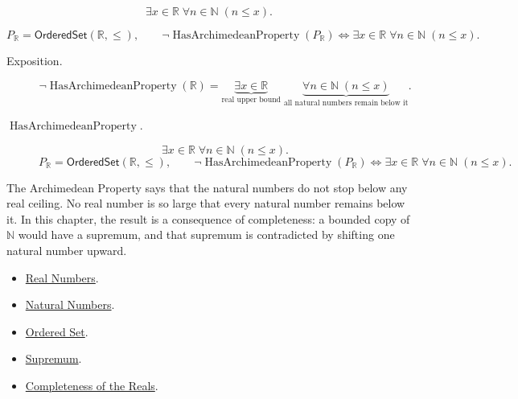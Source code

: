 \begin{remark*}
\[
\exists x\in\mathbb{R}\;\forall n\in\mathbb{N}\;(n\le x).
\]
\end{remark*}

\begin{remark*}
\[
P_{\mathbb{R}}=\mathsf{OrderedSet}(\mathbb{R},\leq),\qquad
\neg\operatorname{HasArchimedeanProperty}(P_{\mathbb{R}})\Longleftrightarrow
\exists x\in\mathbb{R}\;\forall n\in\mathbb{N}\;(n\le x).
\]
\end{remark*}

\begin{remark*}
\begin{description}
  \item[Exposition.]
\[
\neg\operatorname{HasArchimedeanProperty}(\mathbb{R})
=
\underbrace{\exists x\in\mathbb{R}}_{\text{real upper bound}}
\;\underbrace{\forall n\in\mathbb{N}\;(n\le x)}_{\text{all natural numbers remain below it}}.
\]


  \item[\(\operatorname{HasArchimedeanProperty}.\)]
  \[
\exists x\in\mathbb{R}\;\forall n\in\mathbb{N}\;(n\le x).
\]
\[
P_{\mathbb{R}}=\mathsf{OrderedSet}(\mathbb{R},\leq),\qquad
\neg\operatorname{HasArchimedeanProperty}(P_{\mathbb{R}})\Longleftrightarrow
\exists x\in\mathbb{R}\;\forall n\in\mathbb{N}\;(n\le x).
\]
\end{description}
\end{remark*}

\begin{remark*}[Interpretation]
The Archimedean Property says that the natural numbers do not stop below any real ceiling. No real number is so large that every natural number remains below it. In this chapter, the result is a consequence of completeness: a bounded copy of $\mathbb{N}$ would have a supremum, and that supremum is contradicted by shifting one natural number upward.
\end{remark*}

\begin{dependencies}
\begin{itemize}
\item \hyperref[def:reals]{Real Numbers}.
\item \hyperref[def:natural-numbers]{Natural Numbers}.
\item \hyperref[def:ordered-set]{Ordered Set}.
\item \hyperref[def:supremum]{Supremum}.
\item \hyperref[ax:completeness-of-reals]{Completeness of the Reals}.
\end{itemize}
\end{dependencies}
















